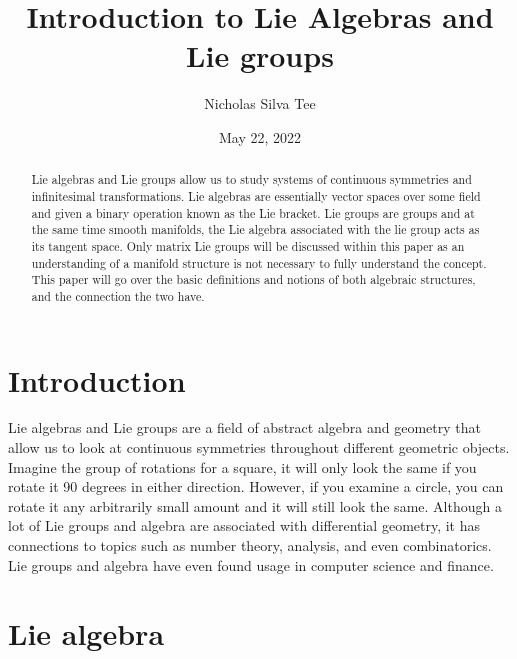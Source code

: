 \documentclass[12pt, letterpaper]{article}
\title{Introduction to Lie Algebras and Lie groups}
\date{May 22, 2022}
\author{Nicholas Silva Tee}
\begin{document}
\maketitle
\begin{abstract}
Lie algebras and Lie groups allow us to study systems of continuous symmetries and infinitesimal transformations. Lie algebras are essentially vector spaces over some field and given a binary operation known as the Lie bracket. Lie groups are groups and at the same time smooth manifolds, the Lie algebra associated with the lie group acts as its tangent space. Only matrix Lie groups will be discussed within this paper as an understanding of a manifold structure is not necessary to fully understand the concept. This paper will go over the basic definitions and notions of both algebraic structures, and the connection the two have. 
\end{abstract}



\section*{Introduction}
	Lie algebras and Lie groups are a field of abstract algebra and geometry that allow us to look at continuous symmetries throughout different geometric objects. Imagine the group of rotations for a square, it will only look the same if you rotate it 90 degrees in either direction. However, if you examine a circle, you can rotate it any arbitrarily small amount and it will still look the same. Although a lot of Lie groups and algebra are associated with differential geometry, it has connections to topics such as number theory, analysis, and even combinatorics. Lie groups and algebra have even found usage in computer science and finance.

\section{Lie algebra}
\end{document}
